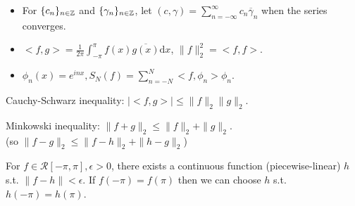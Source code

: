 \begin{notation}
	\begin{itemize}
		\item For $\{c_{n}\}_{n \in \mathbb{Z}}$ and $\{\gamma_n\}_{n \in \mathbb{Z}}$, let $(c,\gamma) = \sum_{n=-\infty}^{\infty}{c_n \overline{\gamma}_n}$ when the series converges.
		\item $<f,g> = \frac{1}{2\pi} \int_{-\pi}^{\pi}{f(x) \overline{g(x)}\mathrm{d}x}$, $\|f\|_2^{2}= < f, f >$.
		\item $\phi_n(x)=e^{inx}, S_N(f)= \sum_{n=-N}^{N}{ <f,\phi_n> \phi_n}$.
	\end{itemize}
\end{notation}


\begin{problem}[6.10]
\label{prob:6.10}
Cauchy-Schwarz inequality: $\left|<f,g>\right|\le \|f\|_2 \|g\|_2$.
\end{problem}

\begin{problem}[6.11]
\label{prob:6.11}
Minkowski inequality: $\|f+g\|_2\le \|f\|_2+\|g\|_2$.\\
(so $\|f-g\|_2\le \|f-h\|_2 + \|h-g\|_2$)
\end{problem}

\begin{problem}[6.12]
\label{prob:6.12}
For $f \in \mathscr{R}[-\pi,\pi], \epsilon>0$, there exists a continuous function (piecewise-linear) $h$ s.t. $\|f-h\|<\epsilon$.
If $f(-\pi)=f(\pi)$ then we can choose $h$ s.t. $h(-\pi)=h(\pi)$.
\end{problem}

